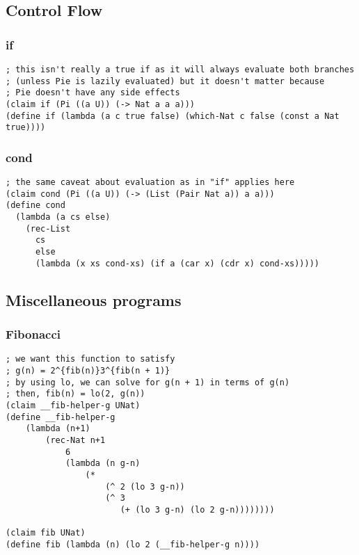\subsection{Control Flow}

\subsubsection{if} \label{code:if}
\begin{lstlisting}
; this isn't really a true if as it will always evaluate both branches
; (unless Pie is lazily evaluated) but it doesn't matter because
; Pie doesn't have any side effects 
(claim if (Pi ((a U)) (-> Nat a a a)))
(define if (lambda (a c true false) (which-Nat c false (const a Nat true))))
\end{lstlisting}

\subsubsection{cond} \label{code:cond}
\begin{lstlisting}
; the same caveat about evaluation as in "if" applies here
(claim cond (Pi ((a U)) (-> (List (Pair Nat a)) a a)))
(define cond
  (lambda (a cs else)
    (rec-List
      cs
      else
      (lambda (x xs cond-xs) (if a (car x) (cdr x) cond-xs)))))
\end{lstlisting}


\subsection{Miscellaneous programs}

\subsubsection{Fibonacci} \label{code:Fibonacci}
\begin{lstlisting}
; we want this function to satisfy
; g(n) = 2^{fib(n)}3^{fib(n + 1)}
; by using lo, we can solve for g(n + 1) in terms of g(n)
; then, fib(n) = lo(2, g(n))
(claim __fib-helper-g UNat)
(define __fib-helper-g
    (lambda (n+1)
        (rec-Nat n+1
            6
            (lambda (n g-n) 
                (*
                    (^ 2 (lo 3 g-n))
                    (^ 3
                       (+ (lo 3 g-n) (lo 2 g-n))))))))

(claim fib UNat)
(define fib (lambda (n) (lo 2 (__fib-helper-g n))))
\end{lstlisting}

